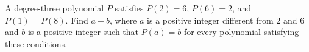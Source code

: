 A degree-three polynomial $P$ satisfies $P(2)=6$, $P(6)=2$, and $P(1)=P(8)$. Find $a+b$, where $a$ is a positive integer different from 2 and 6 and $b$ is a positive integer such that $P(a)=b$ for every polynomial satisfying these conditions.
